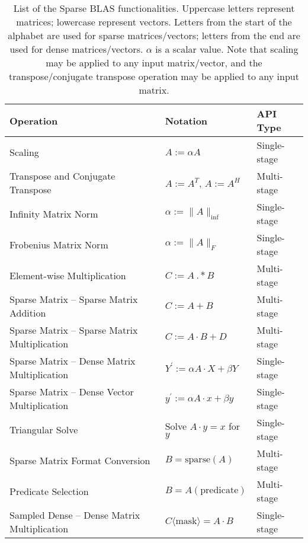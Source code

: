 \documentclass{article}
\begin{document}
\begin{table}[h]
    \centering
    \footnotesize
    \begin{tabular}{lll}%
    \toprule
    \textbf{Operation} & \textbf{Notation} & \textbf{API Type}\\ 
    \midrule
       Scaling                                            & $A := \alpha A$ & Single-stage \\
       Transpose and Conjugate Transpose                  & $A := A^T$, $A := A^H$ & Multi-stage\\
       Infinity Matrix Norm                               & $\alpha := \|A\|_\text{inf}$ & Single-stage \\
       Frobenius Matrix Norm                              & $\alpha := \|A\|_F$  & Single-stage \\
       Element-wise Multiplication                        & $C := A~.*B$  & Multi-stage\\
       Sparse Matrix -- Sparse Matrix Addition            & $C := A+B$ & Multi-stage\\
       Sparse Matrix -- Sparse Matrix Multiplication      & $C := A \cdot B + D$ & Multi-stage\\
       Sparse Matrix -- Dense Matrix Multiplication       & $Y^\prime := \alpha A \cdot X + \beta Y$  & Single-stage \\
       Sparse Matrix -- Dense Vector Multiplication       & $y^\prime := \alpha A \cdot x + \beta y$  & Single-stage \\
       Triangular Solve                                   & Solve $A \cdot y = x$ for $y$  & Single-stage \\
       Sparse Matrix Format Conversion                    & $B = \text{sparse}(A)$ & Multi-stage\\
       Predicate Selection                                &  $B = A( \text{predicate} )$ & Multi-stage \\
       Sampled Dense -- Dense Matrix Multiplication       & $C\langle \text{mask} \rangle = A\cdot B$  & Single-stage\\
    \bottomrule
    \end{tabular}
    \caption{List of the Sparse BLAS functionalities. Uppercase letters represent matrices; lowercase represent vectors. Letters from the start of the alphabet are used for sparse matrices/vectors; letters from the end are used for dense matrices/vectors. $\alpha$ is a scalar value. Note that scaling may be applied to any input matrix/vector, and the transpose/conjugate transpose operation may be applied to any input matrix.} 
    \label{tab:scope}
\end{table}
\end{document}
